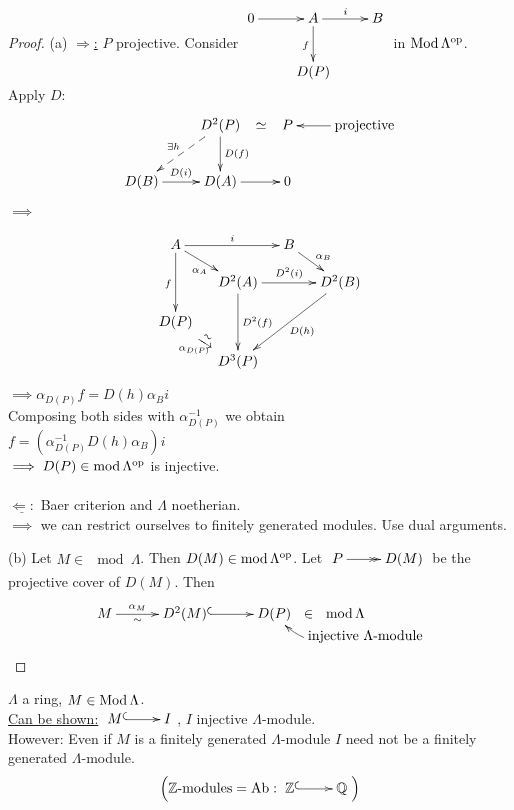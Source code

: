 \begin{proof} (a) \underline{$\Rightarrow$:} $P$ projective. Consider 
$\vcenter{\xymatrix{
0 \ar[r] & A \ar[r]^i \ar[d]_f & B\\
& D(P)
}}$ in $\operatorname{Mod}\Lambda^{{\operatorname{op}\nolimits}}$.\\ Apply $D$:
\[\xymatrix{
& D^2(P) \ar@{-->}[dl]_{\exists h} \ar[d]^{D(f)} \ar@{}[r]|-*[@]{\simeq} & P & \ar[l] \text{projective}\\
D(B) \ar[r]^{D(i)} & D(A) \ar[r] & 0
}\]

$\implies$

\[\xymatrix@C-1pc@R-1pc{
\ar[dd]_f A \ar[rr]^i \ar[dr]_{\alpha_A} && B \ar[dr]^{\alpha_B}\\
& D^2(A) \ar[dd]^{D^2(f)} \ar[rr]^{D^2(i)} && D^2(B) \ar[ddll]^{D(h)}\\
D(P) \ar@{}[dr]|-*[@]{\xrightarrow{\sim}}_{\alpha_{D(P)}}\\
& D^3(P)
}\]

$\implies \alpha_{D(P)}f = D(h)\alpha_Bi$\\
Composing both sides with $\alpha_{D(P)}^{-1}$ we obtain\\
$f = \left( \alpha_{D(P)}^{-1}D(h)\alpha_B \right)i$\\
$\implies D(P) \in \operatorname{mod}\nolimits\Lambda^{{\operatorname{op}\nolimits}}$ is injective.\\
\\
$\underline{\Leftarrow:}$ Baer criterion and $\Lambda$ noetherian.\\
$\implies$ we can restrict ourselves to finitely generated modules. Use dual arguments.

\item[(b)] Let $M \in \mod\Lambda$. Then $D(M) \in
  \operatorname{mod}\nolimits\Lambda^{{\operatorname{op}\nolimits}}$. Let $\xymatrix{P \ar@{->>}[r] & D(M)}$ be the
  projective cover of $D(M)$. Then  
\[\xymatrix@C-1.5pc@R-2pc{M \ar[rrr]^-{\alpha_M}_-\sim &&& D^2(M)
    \ar@{^{(}->}[rrr] &&& D(P) \ar@{}[r]|-*[@]{\in} & \mod\Lambda
    \hspace{1cm}\\ 
              &&&        &&&      & \ar@/^1pc/[ul] \text{injective $\Lambda$-module}}\]

\end{proof}


\begin{rem}
$\Lambda$ a ring, $M \in \operatorname{Mod}\Lambda$.\\
\underline{Can be shown:} $\xymatrix{M \ar@{^{(}->}[r] & I}$, $I$ injective $\Lambda$-module.\\
However: Even if $M$ is a finitely generated $\Lambda$-module $I$ need
not be a finitely generated $\Lambda$-module. 
\[\left( \mathbb{Z}\text{-modules} = \Ab : \xymatrix{\mathbb{Z} \ar@{^{(}->}[r] & \mathbb{Q}} \right)\]
\end{rem}

